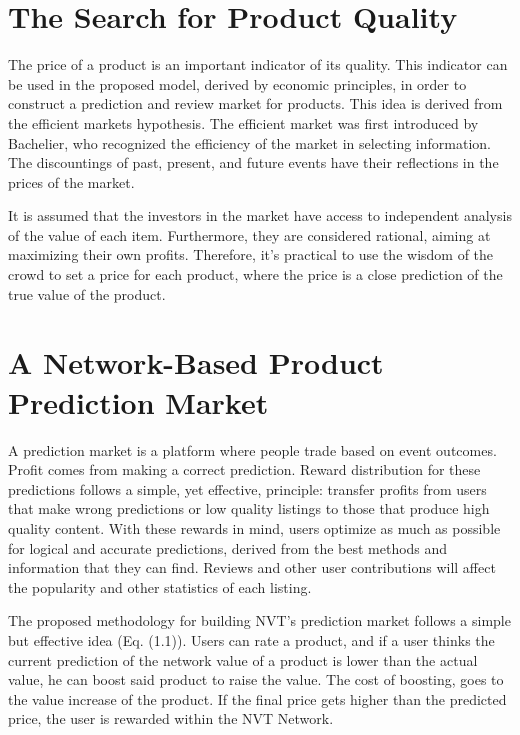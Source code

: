 
\section{The Search for Product Quality}

The price of a product is an important indicator of its quality. This indicator can be used in the proposed model, derived by economic principles, in order to construct a prediction and review market for products. This idea is derived from the efficient markets hypothesis. The efficient market was first introduced by Bachelier, who recognized the efficiency of the market in selecting information. The discountings of past, present, and future events have their reflections in the prices of the market.

It is assumed that the investors in the market have access to independent analysis of the value of each item. Furthermore, they are considered rational, aiming at maximizing their own profits. Therefore, it’s practical to use the wisdom of the crowd to set a price for each product, where the price is a close prediction of the true value of the product.

\section{A Network-Based Product Prediction Market}

A prediction market is a platform where people trade based on event outcomes. Profit comes from making a correct prediction. Reward distribution for these predictions follows a simple, yet effective, principle: transfer profits from users that make wrong predictions or low quality listings to those that produce high quality content. With these rewards in mind, users optimize as much as possible for logical and accurate predictions, derived from the best methods and information that they can find. Reviews and other user contributions will affect the popularity and other statistics of each listing.

The proposed methodology for building NVT's prediction market follows a simple but effective idea (Eq. (1.1)). Users can rate a product, and if a user thinks the current prediction of the network value of a product is lower than the actual value, he can boost said product to raise the value. The cost of boosting, goes to the value increase of the product. If the final price gets higher than the predicted price, the user is rewarded within the NVT Network.

